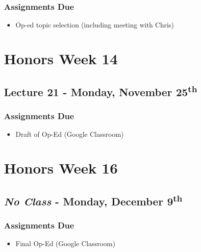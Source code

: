 \documentclass[]{book}
\providecommand{\tightlist}{%
  \setlength{\itemsep}{0pt}\setlength{\parskip}{0pt}}
\begin{document}
\hypertarget{assignments-due-7}{%
\subsubsection*{Assignments Due}\label{assignments-due-7}}

\begin{itemize}
\tightlist
\item
  Op-ed topic selection (including meeting with Chris)
\end{itemize}

\hypertarget{honors-week-14}{%
\section*{Honors Week 14}\label{honors-week-14}}

\hypertarget{lecture-21---monday-november-25th-1}{%
\subsection*{\texorpdfstring{Lecture 21 - Monday, November 25\textsuperscript{th}}{Lecture 21 - Monday, November 25th}}\label{lecture-21---monday-november-25th-1}}

\hypertarget{assignments-due-8}{%
\subsubsection*{Assignments Due}\label{assignments-due-8}}

\begin{itemize}
\tightlist
\item
  Draft of Op-Ed (Google Classroom)
\end{itemize}

\hypertarget{honors-week-16}{%
\section*{Honors Week 16}\label{honors-week-16}}

\hypertarget{no-class---monday-december-9th}{%
\subsection*{\texorpdfstring{\emph{No Class} - Monday, December 9\textsuperscript{th}}{No Class - Monday, December 9th}}\label{no-class---monday-december-9th}}

\hypertarget{assignments-due-9}{%
\subsubsection*{Assignments Due}\label{assignments-due-9}}

\begin{itemize}
\tightlist
\item
  Final Op-Ed (Google Classroom)
\end{itemize}


\end{document}
